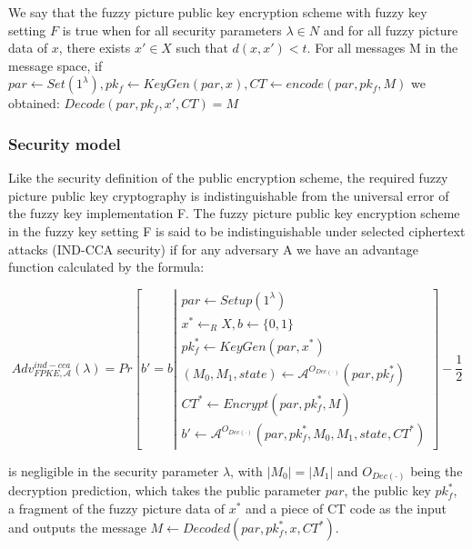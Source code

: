\documentclass[pdflatex,sn-mathphys-num]{sn-jnl}
\theoremstyle{thmstyleone}%
\theoremstyle{thmstyletwo}%
\theoremstyle{thmstylethree}%
\begin{document}
We say that the fuzzy picture public key encryption scheme with fuzzy key setting $F$ is true when for all security parameters $\lambda \in N$ and for all fuzzy picture data of $x$, there exists $x' \in X$ such that $d(x, x') < t$. For all messages M in the message space, if $par \leftarrow Set(1^\lambda), pk_f \leftarrow KeyGen(par, x), CT \leftarrow encode(par, pk_f, M)$ we obtained: $Decode(par, pk_f, x', CT) = M$

\subsubsection{Security model}

Like the security definition of the public encryption scheme, the required fuzzy picture public key cryptography is indistinguishable from the universal error of the fuzzy key implementation F. The fuzzy picture public key encryption scheme in the fuzzy key setting F is said to be indistinguishable under selected ciphertext attacks (IND-CCA security) if for any adversary A we have an advantage function calculated by the formula:

\begin{equation}
	Adv_{FPKE, \mathcal{A}}^{ind-cca}(\lambda) = Pr \left[ b' = b \left| 
	\begin{array}{l}
		par \leftarrow Setup(1^\lambda) \\
		x^* \leftarrow_R X, b \leftarrow \{0, 1\} \\
		pk_f^* \leftarrow KeyGen(par, x^*) \\
		(M_0, M_1, state) \leftarrow \mathcal{A}^{O_{Dec(\cdot)}}(par, pk_f^*) \\
		CT^* \leftarrow Encrypt(par, pk_f^*, M) \\
		b' \leftarrow \mathcal{A}^{O_{Dec(\cdot)}}(par, pk_f^*, M_0, M_1, state, CT^*)
	\end{array}
	\right. \right] - \frac{1}{2}\tag{19}
\end{equation}

is negligible in the security parameter $\lambda$, with $|M_0| = |M_1|$ and $O_{Dec(\cdot)}$ being the decryption prediction, which takes the public parameter $par$, the public key $pk_f^*$, a fragment of the fuzzy picture data of $x^*$ and a piece of CT code as the input and outputs the message $M \leftarrow Decoded(par, pk_f^*, x, CT^*)$.
\end{document}
